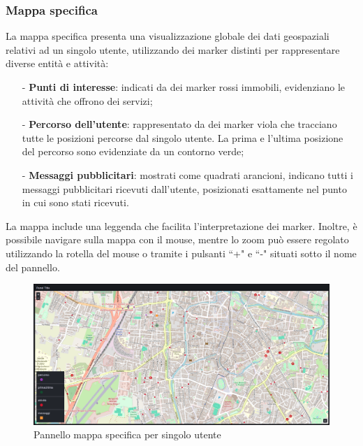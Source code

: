 \documentclass[10pt]{article}
\begin{document}
\begin{justify}
    \subsubsection{Mappa specifica}
    La mappa specifica presenta una visualizzazione globale dei dati geospaziali relativi ad un singolo utente, utilizzando dei marker distinti per rappresentare diverse entità e attività:
    \begin{itemize}
        \item[-] \textbf{Punti di interesse}: indicati da dei marker rossi immobili, evidenziano le attività che offrono dei servizi;
        \item[-] \textbf{Percorso dell'utente}: rappresentato da dei marker viola che tracciano tutte le posizioni percorse dal singolo utente. La prima e l'ultima posizione del percorso sono evidenziate da un contorno verde;
        \item[-] \textbf{Messaggi pubblicitari}: mostrati come quadrati arancioni, indicano tutti i messaggi pubblicitari ricevuti dall'utente, posizionati esattamente nel punto in cui sono stati ricevuti.
    \end{itemize}
    La mappa include una leggenda che facilita l'interpretazione dei marker. Inoltre, è possibile navigare sulla mappa con il mouse, mentre lo zoom può essere regolato utilizzando la rotella del mouse o tramite i pulsanti ``+" e ``-" situati sotto il nome del pannello.
    \begin{figure}[H]
    \centering
    \includegraphics[width=1\linewidth]{mappaspec.png}
    \caption{Pannello mappa specifica per singolo utente}
    \end{figure}


\end{justify}
\end{document}
